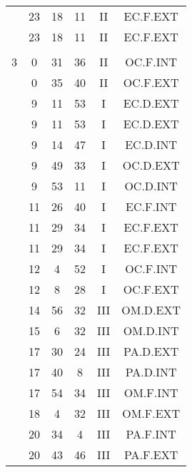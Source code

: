 \documentclass[12pt, a4paper]{article}
\begin{document}
\begin{multicols}{3}
{\begin{tabular}{c c c c c c}
	 	 	 	 & 23 & 18 & 11 & II & EC.F.EXT\\%
	 	 	 	 & 23 & 18 & 11 & II & EC.F.EXT\\%
	 	 	 	 & & & & & \\%
	 	 	 	3 & 0 & 31 & 36 & II & OC.F.INT\\%
	 	 	 	 & 0 & 35 & 40 & II & OC.F.EXT\\%
	 	 	 	 & 9 & 11 & 53 & I & EC.D.EXT\\%
	 	 	 	 & 9 & 11 & 53 & I & EC.D.EXT\\%
	 	 	 	 & 9 & 14 & 47 & I & EC.D.INT\\%
	 	 	 	 & 9 & 49 & 33 & I & OC.D.EXT\\%
	 	 	 	 & 9 & 53 & 11 & I & OC.D.INT\\%
	 	 	 	 & 11 & 26 & 40 & I & EC.F.INT\\%
	 	 	 	 & 11 & 29 & 34 & I & EC.F.EXT\\%
	 	 	 	 & 11 & 29 & 34 & I & EC.F.EXT\\%
	 	 	 	 & 12 & 4 & 52 & I & OC.F.INT\\%
	 	 	 	 & 12 & 8 & 28 & I & OC.F.EXT\\%
	 	 	 	 & 14 & 56 & 32 & III & OM.D.EXT\\%
	 	 	 	 & 15 & 6 & 32 & III & OM.D.INT\\%
	 	 	 	 & 17 & 30 & 24 & III & PA.D.EXT\\%
	 	 	 	 & 17 & 40 & 8 & III & PA.D.INT\\%
	 	 	 	 & 17 & 54 & 34 & III & OM.F.INT\\%
	 	 	 	 & 18 & 4 & 32 & III & OM.F.EXT\\%
	 	 	 	 & 20 & 34 & 4 & III & PA.F.INT\\%
	 	 	 	 & 20 & 43 & 46 & III & PA.F.EXT\\%

\end{tabular}}
\end{multicols}
\end{document}

